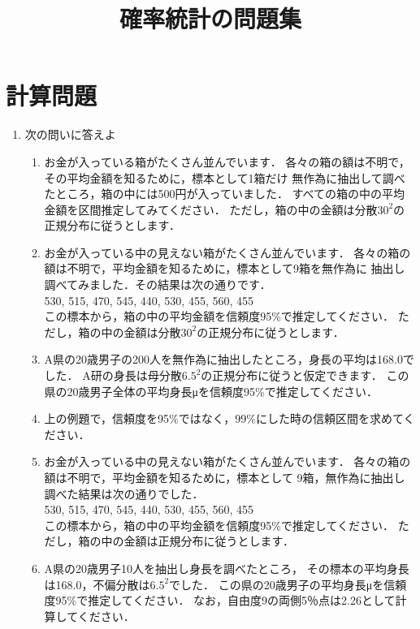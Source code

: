 \documentclass[12pt]{ltjsarticle}
\begin{document}
\title{確率統計の問題集}
\maketitle
\section{計算問題}
\begin{enumerate}
\item 次の問いに答えよ
\begin{enumerate}
\item
お金が入っている箱がたくさん並んでいます．
各々の箱の額は不明で，その平均金額を知るために，標本として1箱だけ
無作為に抽出して調べたところ，箱の中には500円が入っていました．
すべての箱の中の平均金額を区間推定してみてください．
ただし，箱の中の金額は分散$30^2$の正規分布に従うとします．
\cite[p.122]{wakui}
\item
お金が入っている中の見えない箱がたくさん並んでいます．
各々の箱の額は不明で，平均金額を知るために，標本として9箱を無作為に
抽出し調べてみました．その結果は次の通りです．\\
\hspace{1cm} 530, 515, 470, 545, 440, 530, 455, 560, 455 \\
この標本から，箱の中の平均金額を信頼度95\%で推定してください．
ただし，箱の中の金額は分散$30^2$の正規分布に従うとします．
\cite[p.127]{wakui}
\item
A県の20歳男子の200人を無作為に抽出したところ，身長の平均は168.0でした．
A研の身長は母分散$6.5^2$の正規分布に従うと仮定できます．
この県の20歳男子全体の平均身長μを信頼度95\%で推定してください．
\cite[p.131]{wakui}
\item
上の例題で，信頼度を95\%ではなく，99\%にした時の信頼区間を求めてください．
\cite[p.131]{wakui}
\item
お金が入っている中の見えない箱がたくさん並んでいます．
各々の箱の額は不明で，平均金額を知るために，標本として
9箱，無作為に抽出し調べた結果は次の通りでした．\\
\hspace{1cm} 530, 515, 470, 545, 440, 530, 455, 560, 455 \\
この標本から，箱の中の平均金額を信頼度95\%で推定してください．
ただし，箱の中の金額は正規分布に従うとします．
\cite[p.132]{wakui}
\item
A県の20歳男子10人を抽出し身長を調べたところ，
その標本の平均身長は168.0，不偏分散は$6.5^2$でした．
この県の20歳男子の平均身長μを信頼度95\%で推定してください．
なお，自由度9の両側5％点は2.26として計算してください．

\end{enumerate}
\end{enumerate}
\end{document}
